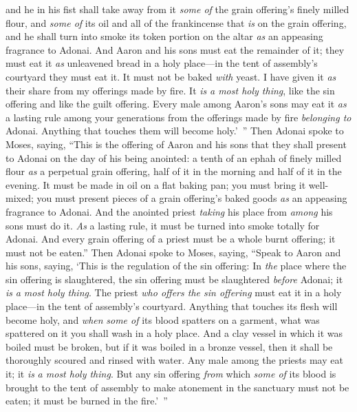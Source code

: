 \begin{biblechapter}
\verse and he in his fist shall take away from it \textit{some of} the grain offering’s finely milled flour, and \textit{some of} its oil and all of the frankincense that \textit{is} on the grain offering, and he shall turn into smoke its token portion on the altar \textit{as} an appeasing fragrance to Adonai.
\verse And Aaron and his sons must eat the remainder of it; they must eat it \textit{as} unleavened bread in a holy place—in the tent of assembly’s courtyard they must eat it.
\verse It must not be baked \textit{with} yeast. I have given it \textit{as} their share from my offerings made by fire. It \textit{is} \textit{a most holy thing}, like the sin offering and like the guilt offering.
\verse Every male among Aaron’s sons may eat it \textit{as} a lasting rule among your generations from the offerings made by fire \textit{belonging to} Adonai. Anything that touches them will become holy.’ ”
\verse Then Adonai spoke to Moses, saying,
\verse “This is the offering of Aaron and his sons that they shall present to Adonai on the day of his being anointed: a tenth of an ephah of finely milled flour \textit{as} a perpetual grain offering, half of it in the morning and half of it in the evening.
\verse It must be made in oil on a flat baking pan; you must bring it well-mixed; you must present pieces of a grain offering’s baked goods \textit{as} an appeasing fragrance to Adonai.
\verse And the anointed priest \textit{taking} his place from \textit{among} his sons must do it. \textit{As} a lasting rule, it must be turned into smoke totally for Adonai.
\verse And every grain offering of a priest must be a whole burnt offering; it must not be eaten.”
 Then Adonai spoke to Moses, saying,
\verse “Speak to Aaron and his sons, saying, ‘This is the regulation of the sin offering: In \textit{the} place where the sin offering is slaughtered, the sin offering must be slaughtered \textit{before} Adonai; it \textit{is} \textit{a most holy thing}.
\verse The priest \textit{who offers the sin offering} must eat it in a holy place—in the tent of assembly’s courtyard.
\verse Anything that touches its flesh will become holy, and \textit{when} \textit{some of} its blood spatters on a garment, what was spattered on it you shall wash in a holy place.
\verse And a clay vessel in which it was boiled must be broken, but if it was boiled in a bronze vessel, then it shall be thoroughly scoured and rinsed with water.
\verse Any male among the priests may eat it; it \textit{is} \textit{a most holy thing}.
\verse But any sin offering \textit{from} which \textit{some of} its blood is brought to the tent of assembly to make atonement in the sanctuary must not be eaten; it must be burned in the fire.’ ”
\end{biblechapter}


